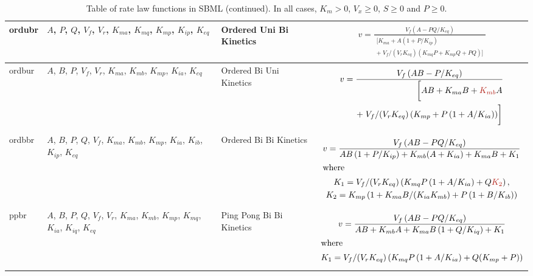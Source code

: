 \documentclass[10pt]{cekarticle}
\newcommand{\changed}[1]{\textcolor{BrickRed}{#1}}
\begin{document}
\begin{table}[ht]
\begin{tabular}{|p{0.45in}|>{\raggedright}m{0.77in}|>{\raggedright}m{1.2in}|m{3.35in}|}
ordubr & $A$, $P$, $Q$, $V_f$, $V_r$, $K_{ma}$, $K_{mq}$, $K_{mp}$, $K_{ip}$,
$K_{eq}$ & Ordered Uni Bi Kinetics &
\begin{gather*}
v = \frac{V_f \left( A - P Q/K_{eq}\right)}{\begin{split}
\biggl[ K_{ma} + A \left( 1 + P/K_{ip}\right) \\
+\; V_f/(V_r K_{eq})
\left( K_{mq} P + K_{mp} Q + P Q\right) \biggr]
\end{split}}
\end{gather*}
\\ \hline

ordbur & $A$, $B$, $P$, $V_f$, $V_r$, $K_{ma}$, \changed{$K_{mb}$}, $K_{mp}$, $K_{ia}$,
$K_{eq}$ & Ordered Bi Uni Kinetics &
\begin{gather*}
v = \frac{V_f \left( A B -
P/K_{eq}\right)}{\begin{split}
\biggl[ A B + K_{ma} B + \changed{K_{mb}} A \\
+\; V_f/(V_r K_{eq}) \left( K_{mp} + P
\left( 1 + A/K_{ia}\right) \right) \biggr]
\end{split}}
\end{gather*}
\\ \hline

ordbbr & $A$, $B$, $P$, $Q$, $V_f$, $K_{ma}$, $K_{mb}$, $K_{mp}$, $K_{ia}$,
$K_{ib}$, $K_{ip}$, $K_{eq}$ & Ordered Bi Bi Kinetics &
\begin{gather*}
v = \frac{V_f
\left( A B - P Q/K_{eq}\right) }{A B \left( 1 + P/K_{ip}\right) + K_{mb}
(A + K_{ia}) + K_{ma} B + K_1} \\
\intertext{where}
K_1 = V_f / (V_r K_{eq}) \left( K_{mq} P \left( 1 + A/K_{ia}\right) + Q \changed{K_2} \right) ,\\
K_2 = K_{mp} \left( 1 + K_{ma} B /(K_{ia} K_{mb}) + P \left( 1 + B/K_{ib} \right) \right)
\end{gather*}
\\ \hline

ppbr & $A$, $B$, $P$, $Q$, $V_f$, $V_r$, $K_{ma}$, $K_{mb}$, $K_{mp}$, $K_{mq}$,
$K_{ia}$, $K_{iq}$, $K_{eq}$ & Ping Pong Bi Bi Kinetics &
\begin{gather*}
v = \frac{V_f
\left( A B - P Q /K_{eq} \right) }{A B + K_{mb} A + K_{ma} B \left( 1 +
  Q/K_{iq}\right)+ K_1 } \\
\intertext{where}
K_1 = V_f/(V_r K_{eq})
\left( K_{mq} P \left( 1 + A/K_{ia} \right) + Q (K_{mp} + P) \right)
\end{gather*}
\\ \hline

\end{tabular}
\caption{Table of rate law functions in SBML (continued).  In all cases, $K_m > 0$, $V_x \geq 0$, $S
  \geq 0$ and $P \geq 0$.}
\end{table}
\end{document}
